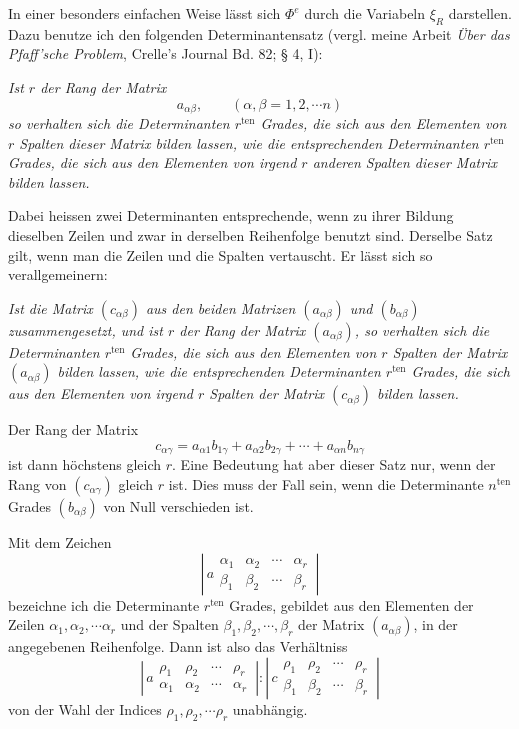\documentclass[11pt]{article}
\begin{document}
In einer besonders einfachen Weise lässt sich $\Phi^e$ durch die Variabeln $\xi_R$ darstellen. Dazu benutze ich den folgenden Determinantensatz (vergl. meine Arbeit \emph{Über das Pfaff'sche Problem}, Crelle's Journal Bd. 82; § 4, I):

\emph{Ist $r$ der Rang der Matrix}
\[
a_{\alpha\beta},\qquad (\alpha,\beta=1,2,\cdots n)
\]
\emph{so verhalten sich die Determinanten $r^{\mathrm{ten}}$ Grades, die sich aus den Elementen von $r$ Spalten dieser Matrix bilden lassen, wie die entsprechenden Determinanten $r^{\mathrm{ten}}$ Grades, die sich aus den Elementen von irgend $r$ anderen Spalten dieser Matrix bilden lassen.}

Dabei heissen zwei Determinanten entsprechende, wenn zu ihrer Bildung dieselben Zeilen und zwar in derselben Reihenfolge benutzt sind. Derselbe Satz gilt, wenn man die Zeilen und die Spalten vertauscht. Er lässt sich so verallgemeinern:

\emph{Ist die Matrix $(c_{\alpha\beta})$ aus den beiden Matrizen $(a_{\alpha\beta})$ und $(b_{\alpha\beta})$ zusammengesetzt, und ist $r$ der Rang der Matrix $(a_{\alpha\beta})$, so verhalten sich die Determinanten $r^{\mathrm{ten}}$ Grades, die sich aus den Elementen von $r$ Spalten der Matrix $(a_{\alpha\beta})$ bilden lassen, wie die entsprechenden Determinanten $r^{\mathrm{ten}}$ Grades, die sich aus den Elementen von irgend $r$ Spalten der Matrix $(c_{\alpha\beta})$ bilden lassen.}

Der Rang der Matrix
\[
c_{\alpha\gamma}=a_{\alpha1}b_{1\gamma}+a_{\alpha2}b_{2\gamma}+\cdots+a_{\alpha n}b_{n\gamma}
\]
ist dann höchstens gleich $r$. Eine Bedeutung hat aber dieser Satz nur, wenn der Rang von $(c_{\alpha\gamma})$ gleich $r$ ist. Dies muss der Fall sein, wenn die Determinante $n^{\mathrm{ten}}$ Grades $(b_{\alpha\beta})$ von Null verschieden ist.

Mit dem Zeichen
\[
\left|\,a\begin{array}{cccc}
\alpha_1&\alpha_2&\cdots&\alpha_r\\
\beta_1&\beta_2&\cdots&\beta_r
\end{array}\,\right|
\]
bezeichne ich die Determinante $r^{\mathrm{ten}}$ Grades, gebildet aus den Elementen der Zeilen $\alpha_1,\alpha_2,\cdots\alpha_r$ und der Spalten $\beta_1,\beta_2,\cdots,\beta_r$ der Matrix $(a_{\alpha\beta})$, in der angegebenen Reihenfolge. Dann ist also das Verhältniss
\[
\left|\,a\begin{array}{cccc}
\rho_1&\rho_2&\cdots&\rho_r\\
\alpha_1&\alpha_2&\cdots&\alpha_r
\end{array}\,\right|:
\left|\,c\begin{array}{cccc}
\rho_1&\rho_2&\cdots&\rho_r\\
\beta_1&\beta_2&\cdots&\beta_r
\end{array}\,\right|
\]
von der Wahl der Indices $\rho_1,\rho_2,\cdots\rho_r$ unabhängig.
\end{document}
